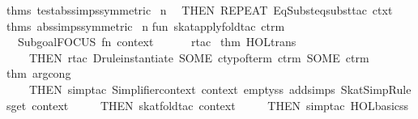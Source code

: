 \begin{isabellebody}
\isaantiq
thms\ test{}abs{}simps{}symmetric{}{}%
\endisaantiq
\ n{}\isanewline
\ \ THEN\ REPEAT\ {}EqSubst{}eqsubst{}tac\ ctxt\ {}{}{}\ %
\isaantiq
thms\ abs{}simps{}symmetric{}{}%
\endisaantiq
\ n{}\isanewline
\isanewline
fun\ skat{}apply{}fold{}tac\ ctrm\ {}\isanewline
\ \ Subgoal{}FOCUS\ {}fn\ {}context{}\ {}{}{}{}\ {}{}\isanewline
\ \ \ \ rtac\ %
\isaantiq
thm\ HOL{}trans{}%
\endisaantiq
\ {}\isanewline
\ \ \ \ THEN\ rtac\ {}Drule{}instantiate{}\ {}SOME\ {}ctyp{}of{}term\ ctrm{}{}\ {}SOME\ ctrm{}\ %
\isaantiq
thm\ arg{}cong{}%
\endisaantiq
{}\ {}\isanewline
\ \ \ \ THEN\ simp{}tac\ {}Simplifier{}context\ context\ empty{}ss\ addsimps\ SkatSimpRules{}get\ context{}\ {}\isanewline
\ \ \ \ THEN\ skat{}fold{}tac\ context\ {}\isanewline
\ \ \ \ THEN\ simp{}tac\ HOL{}basic{}ss\ {}{}\isanewline

\end{isabellebody}
